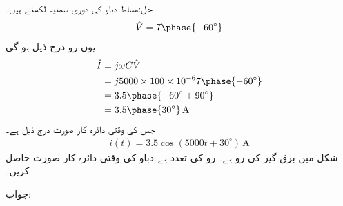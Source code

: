 حل:مسلط دباو کی دوری سمتیہ لکھتے ہیں۔
\begin{align*}
\hat{V}=7\phase{-60^{\circ}}
\end{align*}
یوں رو درج ذیل ہو گی
\begin{align*}
\hat{I}&=j \omega C \hat{V}\\
&=j 5000 \times 100 \times 10^{-6} 7 \phase{-60^{\circ}}\\
&=3.5 \phase{-60^{\circ}+90^{\circ}}\\
&=3.5\phase{30^{\circ}} \, \si{\ampere}
\end{align*}
جس کی وقتی دائرہ کار صورت درج ذیل ہے۔
\begin{align*}
i(t)=3.5\cos(5000 t+30^{\circ}) \, \si{\ampere}
\end{align*}
شکل  میں  برق گیر کی رو  ہے۔ رو کی تعدد  ہے۔دباو کی وقتی دائرہ کار صورت حاصل کریں۔

جواب:


